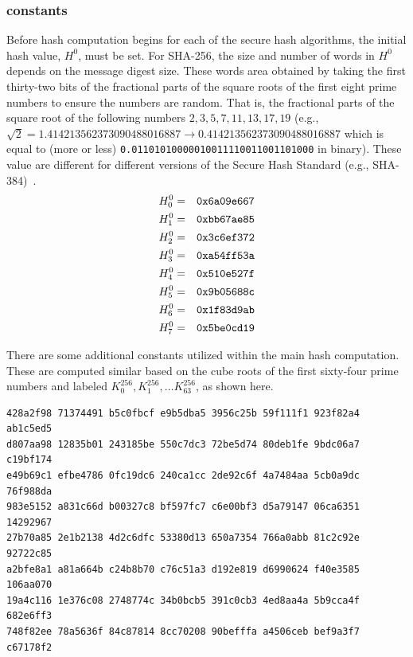 \documentclass{article}
\begin{document}
\subsubsection{constants}
\label{constants.sec}

Before hash computation begins for each of the secure hash algorithms,
the initial hash value,
$H^0$, must be set. For SHA-256, the size and number of words in $H^0$
depends on the message digest size.  These words area obtained by
taking the first thirty-two bits of the fractional parts of the square
roots of the first eight prime numbers to ensure the numbers are
random.  That is, the fractional parts of the square root of the following numbers
$2, 3, 5, 7, 11, 13, 17, 19$ (e.g., $\sqrt{2} = 1.414213562373090488016887
\rightarrow 0.414213562373090488016887$ which is equal to (more or less)
\verb!0.01101010000010011110011001101000! in binary).
These value are different for different versions of the Secure
Hash Standard (e.g., SHA-384)~\cite{1250396}.
\begin{eqnarray*}
  H_0^0 & = & \verb!0x6a09e667!\\
  H_1^0 & = & \verb!0xbb67ae85!\\
  H_2^0 & = & \verb!0x3c6ef372!\\
  H_3^0 & = & \verb!0xa54ff53a!\\
  H_4^0 & = & \verb!0x510e527f!\\
  H_5^0 & = & \verb!0x9b05688c!\\
  H_6^0 & = & \verb!0x1f83d9ab!\\
  H_7^0 & = & \verb!0x5be0cd19!\\
\end{eqnarray*}

There are some additional constants utilized within the main hash
computation.  These are computed similar based on the cube roots of
the first sixty-four prime numbers and labeled
$K_0^{256}, K_1^{256}, \ldots K_{63}^{256}$, as shown here.
\begin{verbatim}
428a2f98 71374491 b5c0fbcf e9b5dba5 3956c25b 59f111f1 923f82a4 ab1c5ed5
d807aa98 12835b01 243185be 550c7dc3 72be5d74 80deb1fe 9bdc06a7 c19bf174
e49b69c1 efbe4786 0fc19dc6 240ca1cc 2de92c6f 4a7484aa 5cb0a9dc 76f988da
983e5152 a831c66d b00327c8 bf597fc7 c6e00bf3 d5a79147 06ca6351 14292967
27b70a85 2e1b2138 4d2c6dfc 53380d13 650a7354 766a0abb 81c2c92e 92722c85
a2bfe8a1 a81a664b c24b8b70 c76c51a3 d192e819 d6990624 f40e3585 106aa070
19a4c116 1e376c08 2748774c 34b0bcb5 391c0cb3 4ed8aa4a 5b9cca4f 682e6ff3
748f82ee 78a5636f 84c87814 8cc70208 90befffa a4506ceb bef9a3f7 c67178f2
\end{verbatim}
\end{document}
